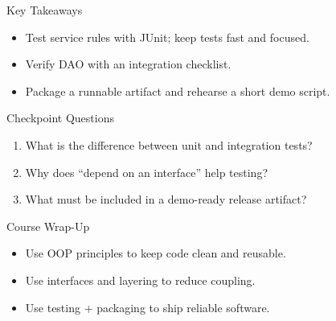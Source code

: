 \documentclass{beamer}
\begin{document}
\begin{frame}{Key Takeaways}
  \begin{itemize}[<+->]
    \item Test service rules with JUnit; keep tests fast and focused.
    \item Verify DAO with an integration checklist.
    \item Package a runnable artifact and rehearse a short demo script.
  \end{itemize}
  \slidesources{\OOPSUnitVISources}
\end{frame}

\begin{frame}{Checkpoint Questions}
  \begin{enumerate}[<+->]
    \item What is the difference between unit and integration tests?
    \item Why does ``depend on an interface'' help testing?
    \item What must be included in a demo-ready release artifact?
  \end{enumerate}
  \slidesources{\OOPSUnitVISources}
\end{frame}

\begin{frame}{Course Wrap-Up}
  \begin{itemize}[<+->]
    \item Use OOP principles to keep code clean and reusable.
    \item Use interfaces and layering to reduce coupling.
    \item Use testing + packaging to ship reliable software.
  \end{itemize}
  \slidesources{\OOPSUnitVISources}
\end{frame}
\end{document}

